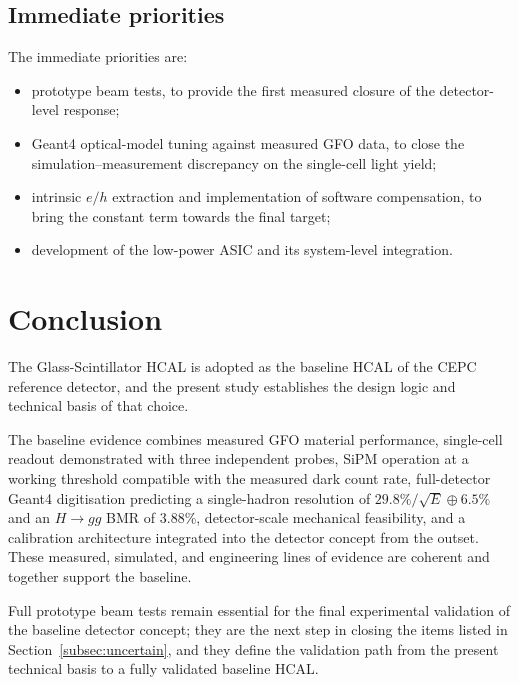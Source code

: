 \subsection{Immediate priorities}
\label{subsec:priorities}

The immediate priorities are:
\begin{itemize}
\item prototype beam tests, to provide the first measured closure of
  the detector-level response;
\item Geant4 optical-model tuning against measured GFO data, to
  close the simulation--measurement discrepancy on the single-cell
  light yield;
\item intrinsic $e/h$ extraction and implementation of software
  compensation, to bring the constant term towards the final target;
\item development of the low-power ASIC and its system-level
  integration.
\end{itemize}

\section{Conclusion}
\label{sec:conclusion}

The Glass-Scintillator HCAL is adopted as the baseline HCAL of the
CEPC reference detector, and the present study establishes the design
logic and technical basis of that choice.

The baseline evidence combines measured GFO material performance,
single-cell readout demonstrated with three independent probes, SiPM
operation at a working threshold compatible with the measured dark
count rate, full-detector Geant4 digitisation predicting a
single-hadron resolution of $29.8\%/\sqrt{E}\oplus6.5\%$ and an
$H\to gg$ BMR of 3.88\%, detector-scale mechanical feasibility, and a
calibration architecture integrated into the detector concept from
the outset.
These measured, simulated, and engineering lines of evidence are
coherent and together support the baseline.

Full prototype beam tests remain essential for the final experimental
validation of the baseline detector concept; they are the next step
in closing the items listed in Section~\ref{subsec:uncertain}, and
they define the validation path from the present technical basis to a
fully validated baseline HCAL.

